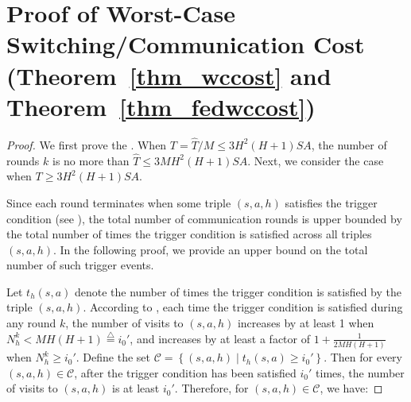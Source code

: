 \documentclass{article}
\begin{document}
\section{Proof of Worst-Case Switching/Communication Cost \texorpdfstring{(Theorem~\ref{thm_wccost} and Theorem~\ref{thm_fedwccost})}{(Theorem 4.2 and Theorem 4.4)}}
\label{worstcost}
\begin{proof}
We first prove the . When $T = \hat{T} /M \leq 3H^2(H+1)SA$, the number of rounds $k$ is no more than $\hat{T} \leq 3MH^2(H+1)SA$. Next, we consider the case when $T \geq 3H^2(H+1)SA$.

Since each round terminates when some triple \( (s, a, h) \) satisfies the trigger condition (see ), the total number of communication rounds is upper bounded by the total number of times the trigger condition is satisfied across all triples \( (s, a, h) \). In the following proof, we provide an upper bound on the total number of such trigger events.


Let \( t_h(s,a) \) denote the number of times the trigger condition is satisfied by the triple \( (s, a, h) \). According to , each time the trigger condition is satisfied during any round \( k \), the number of visits to \( (s, a, h) \) increases by at least 1 when \( N_h^k < MH(H+1) \overset{\triangle}{=} i_0' \), and increases by at least a factor of \( 1 + \frac{1}{2MH(H+1)} \) when \( N_h^k \geq i_0'  \). Define the set
$\mathcal{C} = \left\{ (s, a, h) \mid t_h(s, a) \geq i_0' \right\}.$
Then for every \( (s, a, h) \in \mathcal{C} \), after the trigger condition has been satisfied \( i_0'  \) times, the number of visits to \( (s, a, h) \) is at least \( i_0'  \). Therefore, for $(s,a,h) \in \mathcal{C}$, we have:


\end{proof}
\end{document}
